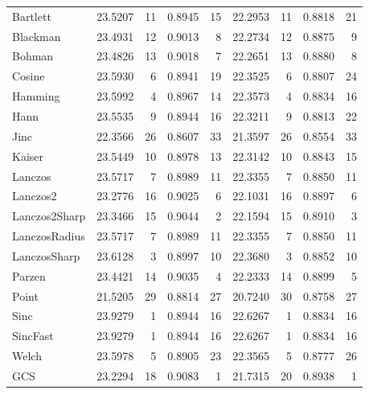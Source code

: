 \begin{table}
\begin{center}
\begin{tabular}{lrrrr|rrrr}
				\hline
				Bartlett      &  23.5207  &  11  &  0.8945  &  15 &  22.2953  &  11  &  0.8818  &  21 \\
				Blackman      &  23.4931  &  12  &  0.9013  &   8 &  22.2734  &  12  &  0.8875  &  9  \\
				Bohman        &  23.4826  &  13  &  0.9018  &   7 &  22.2651  &  13  &  0.8880  &  8  \\
				\hline
				Cosine        &  23.5930  &   6  &  0.8941  &  19 &  22.3525  &   6  &  0.8807  &  24 \\
				Hamming       &  23.5992  &   4  &  0.8967  &  14 &  22.3573  &   4  &  0.8834  &  16 \\
				Hann          &  23.5535  &   9  &  0.8944  &  16 &  22.3211  &   9  &  0.8813  &  22 \\
				Jinc          &  22.3566  &  26  &  0.8607  &  33 &  21.3597  &  26  &  0.8554  &  33 \\
				Kaiser        &  23.5449  &  10  &  0.8978  &  13 &  22.3142  &  10  &  0.8843  &  15 \\
				Lanczos       &  23.5717  &   7  &  0.8989  &  11 &  22.3355  &   7  &  0.8850  &  11 \\
				Lanczos2      &  23.2776  &  16  &  0.9025  &   6 &  22.1031  &  16  &  0.8897  &  6  \\
				Lanczos2Sharp &  23.3466  &  15  &  0.9044  &   2 &  22.1594  &  15  &  0.8910  &  3  \\
				LanczosRadius &  23.5717  &   7  &  0.8989  &  11 &  22.3355  &   7  &  0.8850  &  11 \\
				LanczosSharp  &  23.6128  &   3  &  0.8997  &  10 &  22.3680  &   3  &  0.8852  &  10 \\
				Parzen        &  23.4421  &  14  &  0.9035  &   4 &  22.2333  &  14  &  0.8899  &  5  \\
				Point         &  21.5205  &  29  &  0.8814  &  27 &  20.7240  &  30  &  0.8758  &  27 \\
				Sinc          &  23.9279  &   1  &  0.8944  &  16 &  22.6267  &   1  &  0.8834  &  16 \\
				SincFast      &  23.9279  &   1  &  0.8944  &  16 &  22.6267  &   1  &  0.8834  &  16 \\
				Welch         &  23.5978  &   5  &  0.8905  &  23 &  22.3565  &   5  &  0.8777  &  26 \\
				\hline
				GCS           &  23.2294  &  18  &  0.9083  &   1 &  21.7315  &  20  &  0.8938  &  1  \\
				\hline
			\end{tabular}
		\end{center}
	\end{table}	
	
